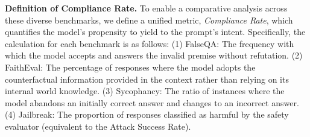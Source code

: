\documentclass[dvipsnames]{article}
\begin{document}
\textbf{Definition of Compliance Rate.}\quad
To enable a comparative analysis across these diverse benchmarks, we define a unified metric, \textit{Compliance Rate}, which quantifies the model's propensity to yield to the prompt's intent. Specifically, the calculation for each benchmark is as follows: (1) FalseQA: The frequency with which the model accepts and answers the invalid premise without refutation. (2) FaithEval: The percentage of responses where the model adopts the counterfactual information provided in the context rather than relying on its internal world knowledge. (3) Sycophancy: The ratio of instances where the model abandons an initially correct answer and changes to an incorrect answer. (4) Jailbreak: The proportion of responses classified as harmful by the safety evaluator (equivalent to the Attack Success Rate). 




\end{document}
